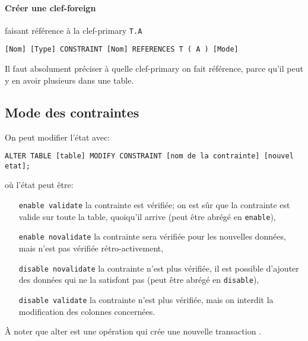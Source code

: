 \documentclass[10pt,a4paper,french]{article}
\begin{document}
\paragraph{Créer une \gls{clef-foreign}} faisant référence à la \gls{clef-primary} {\tt T.A}
\begin{verbatim}
[Nom] [Type] CONSTRAINT [Nom] REFERENCES T ( A ) [Mode]
\end{verbatim}
Il faut absolument préciser à quelle \gls{clef-primary} on fait référence, parce qu'il peut y en avoir plusieurs dans une table.

\subsection{Mode des contraintes}\label{sec:constraint:mode}

On peut modifier l'état avec:
\begin{verbatim}
ALTER TABLE [table] MODIFY CONSTRAINT [nom de la contrainte] [nouvel etat];
\end{verbatim}
où l'état peut être:
\begin{itemize}
\item[\tt \gls{enable} \gls{validate}] la contrainte est vérifiée; on est sûr que la contrainte est valide sur toute la table, quoiqu'il arrive (peut être abrégé en {\tt \gls{enable}}),
\item[\tt \gls{enable} \gls{novalidate}] la contrainte sera vérifiée pour les nouvelles données, mais n'est pas vérifiée rétro-activement,
\item[\tt \gls{disable} \gls{novalidate}] la contrainte n'est plus vérifiée, il est possible d'ajouter des données qui ne la satisfont pas (peut être abrégé en {\tt \gls{disable}}),
\item[\tt \gls{disable} \gls{validate}] la contrainte n'est plus vérifiée, mais on interdit la modification des colonnes concernées.
\end{itemize}

À noter que \gls{alter} est une opération qui crée une nouvelle transaction .

\section{}

\section{}
\end{document}
